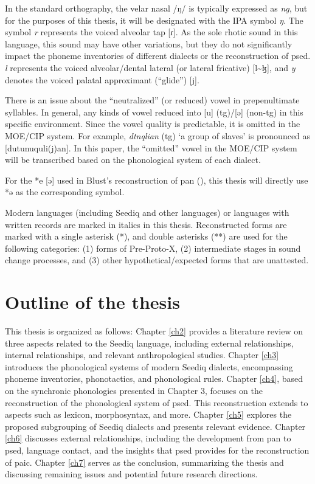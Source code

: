 In the standard orthography, the velar nasal /ŋ/ is typically expressed as \textit{ng}, but for the purposes of this thesis, it will be designated with the IPA symbol \textit{ŋ}. The symbol \textit{r} represents the voiced alveolar tap [ɾ]. As the sole rhotic sound in this language, this sound may have other variations, but they do not significantly impact the phoneme inventories of different dialects or the reconstruction of \acl{psed}. \textit{l} represents the voiced alveolar/dental lateral (or lateral fricative) [l\~{ }ɮ], and \textit{y} denotes the voiced palatal approximant (``glide'') [j].

There is an issue about the ``neutralized'' (or reduced) vowel in prepenultimate syllables. In general, any kinds of vowel reduced into [u] (\ac{tg})/[ə] (non-\ac{tg}) in this specific environment. Since the vowel quality is predictable, it is omitted in the MOE/CIP system. For example, \textit{dtnqlian} (\ac{tg}) `a group of slaves' is pronounced as [dutunuquli(j)an]. In this paper, the ``omitted'' vowel in the MOE/CIP system will be transcribed based on the phonological system of each dialect. 

For the *e [ə] used in Blust's reconstruction of \acl{pan} (\cite{ACD}), this thesis will directly use *ə as the corresponding symbol. 

Modern languages (including Seediq and other languages) or languages with written records are marked in italics in this thesis. Reconstructed forms are marked with a single asterisk (*), and double asterisks (**) are used for the following categories: (1) forms of Pre-Proto-X, (2) intermediate stages in sound change processes, and (3) other hypothetical/expected forms that are unattested.

\section{Outline of the thesis}

This thesis is organized as follows: Chapter \ref{ch2} provides a literature review on three aspects related to the Seediq language, including external relationships, internal relationships, and relevant anthropological studies. Chapter \ref{ch3} introduces the phonological systems of modern Seediq dialects, encompassing phoneme inventories, phonotactics, and phonological rules. Chapter \ref{ch4}, based on the synchronic phonologies presented in Chapter 3, focuses on the reconstruction of the phonological system of \acl{psed}. This reconstruction extends to aspects such as lexicon, morphosyntax, and more. Chapter \ref{ch5} explores the proposed subgrouping of Seediq dialects and presents relevant evidence. Chapter \ref{ch6} discusses external relationships, including the development from \acl{pan} to \acl{psed}, language contact, and the insights that \acl{psed} provides for the reconstruction of \acl{paic}. Chapter \ref{ch7} serves as the conclusion, summarizing the thesis and discussing remaining issues and potential future research directions.